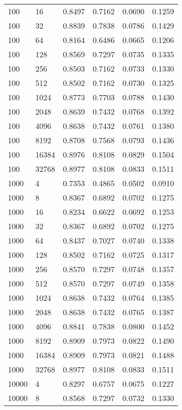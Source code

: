 \begin{table}[H]
\begin{tabularx}{\textwidth}{
        |X
        |X
        |X
        |X
        |X
        |X|
    }
    100 & 16 & 0.8497 & 0.7162 & 0.0690 & 0.1259 \\
    100 & 32 & 0.8839 & 0.7838 & 0.0786 & 0.1429 \\
    100 & 64 & 0.8164 & 0.6486 & 0.0665 & 0.1206 \\
    100 & 128 & 0.8569 & 0.7297 & 0.0735 & 0.1335 \\
    100 & 256 & 0.8503 & 0.7162 & 0.0733 & 0.1330 \\
    100 & 512 & 0.8502 & 0.7162 & 0.0730 & 0.1325 \\
    100 & 1024 & 0.8773 & 0.7703 & 0.0788 & 0.1430 \\
    100 & 2048 & 0.8639 & 0.7432 & 0.0768 & 0.1392 \\
    100 & 4096 & 0.8638 & 0.7432 & 0.0761 & 0.1380 \\
    100 & 8192 & 0.8708 & 0.7568 & 0.0793 & 0.1436 \\
    100 & 16384 & 0.8976 & 0.8108 & 0.0829 & 0.1504 \\
    100 & 32768 & 0.8977 & 0.8108 & 0.0833 & 0.1511 \\
    1000 & 4 & 0.7353 & 0.4865 & 0.0502 & 0.0910 \\
    1000 & 8 & 0.8367 & 0.6892 & 0.0702 & 0.1275 \\
    1000 & 16 & 0.8234 & 0.6622 & 0.0692 & 0.1253 \\
    1000 & 32 & 0.8367 & 0.6892 & 0.0702 & 0.1275 \\
    1000 & 64 & 0.8437 & 0.7027 & 0.0740 & 0.1338 \\
    1000 & 128 & 0.8502 & 0.7162 & 0.0725 & 0.1317 \\
    1000 & 256 & 0.8570 & 0.7297 & 0.0748 & 0.1357 \\
    1000 & 512 & 0.8570 & 0.7297 & 0.0749 & 0.1358 \\
    1000 & 1024 & 0.8638 & 0.7432 & 0.0764 & 0.1385 \\
    1000 & 2048 & 0.8638 & 0.7432 & 0.0765 & 0.1387 \\
    1000 & 4096 & 0.8841 & 0.7838 & 0.0800 & 0.1452 \\
    1000 & 8192 & 0.8909 & 0.7973 & 0.0822 & 0.1490 \\
    1000 & 16384 & 0.8909 & 0.7973 & 0.0821 & 0.1488 \\
    1000 & 32768 & 0.8977 & 0.8108 & 0.0833 & 0.1511 \\
    10000 & 4 & 0.8297 & 0.6757 & 0.0675 & 0.1227 \\
    10000 & 8 & 0.8568 & 0.7297 & 0.0732 & 0.1330 \\

\end{tabularx}
\end{table}
